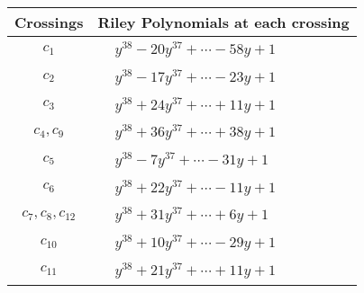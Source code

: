\documentclass[1p]{elsarticle_modified}
\theoremstyle{definition}
\begin{document}
\begin{tabular}{m{50pt}|m{274pt}}
Crossings & \hspace{64pt}Riley Polynomials at each crossing \\
\hline $$\begin{aligned}c_{1}\end{aligned}$$&$\begin{aligned}
&y^{38}-20 y^{37}+\cdots-58 y+1
\end{aligned}$\\
\hline $$\begin{aligned}c_{2}\end{aligned}$$&$\begin{aligned}
&y^{38}-17 y^{37}+\cdots-23 y+1
\end{aligned}$\\
\hline $$\begin{aligned}c_{3}\end{aligned}$$&$\begin{aligned}
&y^{38}+24 y^{37}+\cdots+11 y+1
\end{aligned}$\\
\hline $$\begin{aligned}c_{4},c_{9}\end{aligned}$$&$\begin{aligned}
&y^{38}+36 y^{37}+\cdots+38 y+1
\end{aligned}$\\
\hline $$\begin{aligned}c_{5}\end{aligned}$$&$\begin{aligned}
&y^{38}-7 y^{37}+\cdots-31 y+1
\end{aligned}$\\
\hline $$\begin{aligned}c_{6}\end{aligned}$$&$\begin{aligned}
&y^{38}+22 y^{37}+\cdots-11 y+1
\end{aligned}$\\
\hline $$\begin{aligned}c_{7},c_{8},c_{12}\end{aligned}$$&$\begin{aligned}
&y^{38}+31 y^{37}+\cdots+6 y+1
\end{aligned}$\\
\hline $$\begin{aligned}c_{10}\end{aligned}$$&$\begin{aligned}
&y^{38}+10 y^{37}+\cdots-29 y+1
\end{aligned}$\\
\hline $$\begin{aligned}c_{11}\end{aligned}$$&$\begin{aligned}
&y^{38}+21 y^{37}+\cdots+11 y+1
\end{aligned}$\\
\hline
\end{tabular}\\~\\
\end{document}
